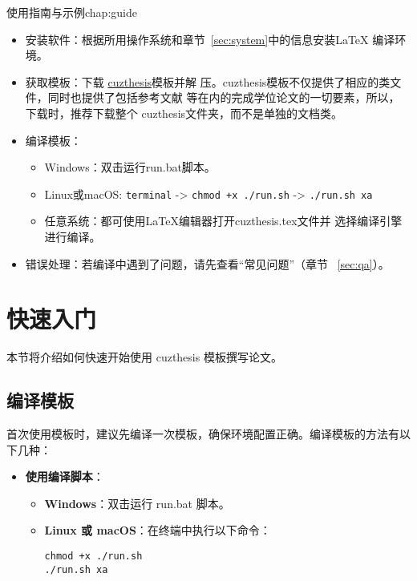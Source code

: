 \begin{cuzchapter}{使用指南与示例}{chap:guide}
    \begin{itemize}
        \item 安装软件：根据所用操作系统和章节~\ref{sec:system}中的信息安装\LaTeX{}
              编译环境。
        \item 获取模板：下载
              \href{https://github.com/xiehao/CUZThesis}{cuzthesis}模板并解
              压。cuzthesis模板不仅提供了相应的类文件，同时也提供了包括参考文献
              等在内的完成学位论文的一切要素，所以，下载时，推荐下载整个
              cuzthesis文件夹，而不是单独的文档类。
        \item 编译模板：
              \begin{itemize}
                  \item Windows：双击运行run.bat脚本。
                  \item Linux或macOS: {\small \verb|terminal| -> \verb|chmod +x ./run.sh| -> \verb|./run.sh xa|}
                  \item 任意系统：都可使用\LaTeX{}编辑器打开cuzthesis.tex文件并
                        选择编译引擎进行编译。
              \end{itemize}
        \item 错误处理：若编译中遇到了问题，请先查看“常见问题”（章节
              ~\ref{sec:qa}）。
    \end{itemize}

    \section{快速入门}\label{sec:quickstart}

    本节将介绍如何快速开始使用 cuzthesis 模板撰写论文。

    \subsection{编译模板}

    首次使用模板时，建议先编译一次模板，确保环境配置正确。编译模板的方法有以下几种：

    \begin{itemize}
        \item \textbf{使用编译脚本}：
        \begin{itemize}
            \item \textbf{Windows}：双击运行 run.bat 脚本。
            \item \textbf{Linux 或 macOS}：在终端中执行以下命令：
            \begin{verbatim}
chmod +x ./run.sh
./run.sh xa
            \end{verbatim}
        \end{itemize}


\end{itemize}
\end{cuzchapter}
